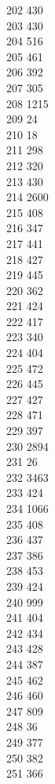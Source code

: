 { 202	430 \\
 203	430 \\
 204	516 \\
 205	461 \\
 206	392 \\
 207	305 \\
 208	1215 \\
 209	24 \\
 210	18 \\
 211	298 \\
 212	320 \\
 213	430 \\
 214	2600 \\
 215	408 \\
 216	347 \\
 217	441 \\
 218	427 \\
 219	445 \\
 220	362 \\
 221	424 \\
 222	417 \\
 223	340 \\
 224	404 \\
 225	472 \\
 226	445 \\
 227	427 \\
 228	471 \\
 229	397 \\
 230	2894 \\
 231	26 \\
 232	3463 \\
 233	424 \\
 234	1066 \\
 235	408 \\
 236	437 \\
 237	386 \\
 238	453 \\
 239	424 \\
 240	999 \\
 241	404 \\
 242	434 \\
 243	428 \\
 244	387 \\
 245	462 \\
 246	460 \\
 247	809 \\
 248	36 \\
 249	377 \\
 250	382 \\
 251	366 \\
}
